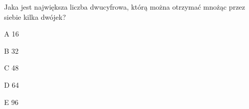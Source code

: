 \begin{tresc}
Jaka jest największa liczba dwucyfrowa, którą można otrzymać mnożąc przez siebie kilka dwójek?
\end{tresc}
\begin{wariant}{A} 16 \end{wariant}
\begin{wariant}{B} 32 \end{wariant}
\begin{wariant}{C} 48 \end{wariant}
\begin{wariant}{D} 64 \end{wariant}
\begin{wariant}{E} 96 \end{wariant}
